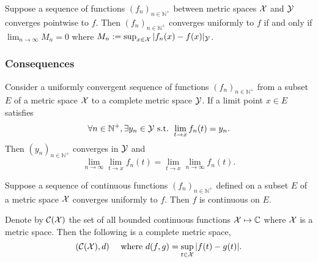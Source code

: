 \begin{lem}
  \label{lem:pointwise2uniformConvergence}
  Suppose a sequence of functions $(f_n)_{n\in\mathbb{N}^+}$ 
  between metric spaces ${\cal X}$ and ${\cal Y}$
  converges pointwise to $f$. %
  Then $(f_n)_{n\in\mathbb{N}^+}$ converges
  uniformly to $f$ if and only if
  $\lim_{n\rightarrow \infty} M_n =0$
  where $M_n:=\sup_{x\in {\cal X}}|f_n(x)-f(x)|_{\cal Y}$.
\end{lem}

\subsubsection{Consequences}

\begin{lem}
  \label{lem:uniformConvergenceAndCont}
  Consider a uniformly convergent sequence of functions
  $(f_n)_{n\in\mathbb{N}^+}$  %
  from a subset $E$ of a metric space ${\cal X}$
  to a complete metric space ${\cal Y}$. 
  If a limit point $x\in E$ satisfies
  \begin{equation}
    \label{eq:uniformConvergenceAndContCondition}
    \forall n\in\mathbb{N}^+, \exists y_n\in {\cal Y} \text{ s.t. }
    \lim_{t\rightarrow x}f_n(t) = y_n.
  \end{equation}
  Then $(y_n)_{n\in\mathbb{N}^+}$ converges in ${\cal Y}$
  and 
  \begin{equation}
    \label{eq:uniformConvergenceAndCont}
    \lim_{n\rightarrow\infty} \lim_{t\rightarrow x}f_n(t)
    = \lim_{t\rightarrow x}\lim_{n\rightarrow\infty}f_n(t).
  \end{equation}
\end{lem}

\begin{coro}
  \label{coro:uniformLimitIsCont}
  Suppose a sequence of continuous functions $(f_n)_{n\in\mathbb{N}^+}$ 
  defined on a subset $E$ of a metric space ${\cal X}$
  converges uniformly to $f$.
  Then $f$ is continuous on $E$.
\end{coro}

\begin{coro}
  \label{coro:CXisComplete}
  Denote by ${\cal C}({\cal X})$
  the set of all bounded continuous functions
  ${\cal X}\mapsto \mathbb{C}$
  where ${\cal X}$ is a metric space.
  Then the following is a complete metric space,
  \begin{equation}
    \label{eq:CXcomplete}
    ({\cal C}({\cal X}),d)\quad \text{ where }
    d(f,g)=\sup_{t\in {\cal X}}|f(t)-g(t)|. 
  \end{equation}
\end{coro}

